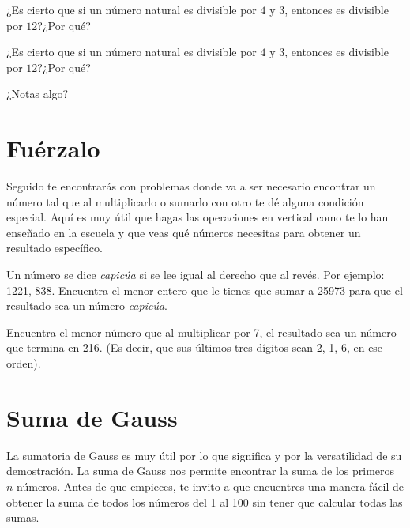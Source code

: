\begin{exercise}
    ¿Es cierto que si un número natural es divisible por $4$ y 
    $3$, entonces es divisible por $12$?¿Por qué?
\end{exercise}

\begin{exercise}
    ¿Es cierto que si un número natural es divisible por $4$ y 
    $3$, entonces es divisible por $12$?¿Por qué?
\end{exercise}

\begin{question}
    ¿Notas algo?
\end{question}

\section{Fuérzalo}

Seguido te encontrarás con problemas donde va a ser necesario 
encontrar un número tal que al multiplicarlo o sumarlo con otro 
te dé alguna condición especial. Aquí es muy útil que hagas las 
operaciones en vertical como te lo han enseñado en la escuela y 
que veas qué números necesitas para obtener un resultado 
específico.

\begin{exercise}
    Un número se dice \textit{capicúa} si se lee igual al 
    derecho que al revés. Por ejemplo: 1221, 838. Encuentra el 
    menor entero que le tienes que sumar a 25973 para que el 
    resultado sea un número \textit{capicúa}.
\end{exercise}

\begin{exercise}
    Encuentra el menor número que al multiplicar por 7, el 
    resultado sea un número que termina en 216. (Es decir, que 
    sus últimos tres dígitos sean 2, 1, 6, en ese orden).
\end{exercise}

\section{Suma de Gauss}

La sumatoria de Gauss es muy útil por lo que significa y por la 
versatilidad de su demostración. La suma de Gauss nos permite 
encontrar la suma de los primeros \(n\) números. Antes de que 
empieces, te invito a que encuentres una manera fácil de obtener 
la suma de todos los números del 1 al 100 sin tener que calcular 
todas las sumas.

